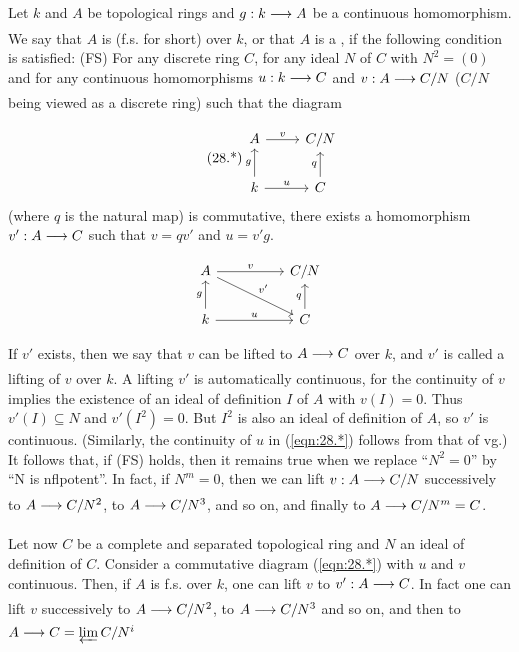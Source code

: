 \documentclass[../main]{subfiles}
\begin{document}
\begin{pardefinition}
Let $k$ and $A$ be topological rings and $g: k \varrightarrow{} A$ be a continuous homomorphism. We say that $A$ is \label{def:28.formally smooth} (f.s. for short) over $k$, or that $A$ is a , if the following condition is satisfied: (FS) For any discrete ring $C$, for any ideal $N$ of $C$ with $N^2=(0)$ and for any continuous homomorphisms $u: k \varrightarrow{} C$ and $v: A \varrightarrow{} C / N$ ($C / N$ being viewed as a discrete ring) such that the diagram

\[\tag{28.*}\label{eqn:28.*} \begin{tikzcd} A \arrow[r,"v"] & C/N\\ k \arrow[u,"g"] \arrow[r,"u"] &C \arrow[u,"q"]\end{tikzcd}\] (where $q$ is the natural map) is commutative, there exists a homomorphism \newline $v': A \varrightarrow{} C$ such that $v=q v'$ and $u=v'g$. \[\begin{tikzcd} A\arrow[rr,"v"] \arrow[rrd,"v'"] && C/N \\ k\arrow[u,"g"] \arrow[rr,"u"] &&C\arrow[u,"q"]\end{tikzcd}\]
\end{pardefinition}

\begin{remark}
If $v'$ exists, then we say that $v$ can be lifted to $A \varrightarrow{} C$ over $k$, and $v'$ is called a lifting of $v$ over $k$. A lifting $v'$ is automatically continuous, for the continuity of $v$ implies the existence of an ideal of definition $I$ of $A$ with $v(I)=0$. Thus $v'(I) \subseteq N$ and $v'(I^2)=0$. But $I^2$ is also an ideal of definition of $A$, so $v'$ is continuous. (Similarly, the continuity of $u$ in (\ref{eqn:28.*}) follows from that of vg.) It follows that, if (FS) holds, then it remains true when we replace ``$N^2=0$'' by ``N is nflpotent''. In fact, if $N^m=0$, then we can lift $v: A\varrightarrow{}C / N$ successively to $A \varrightarrow{} C / N^2$, to $A \varrightarrow{} C / N^3$, and so on, and finally to $A \varrightarrow{} C / N^m=C$.

Let now $C$ be a complete and separated topological ring and $N$ an ideal of definition of $C$. Consider a commutative diagram (\ref{eqn:28.*}) with $u$ and $v$ continuous. Then, if $A$ is f.s. over $k$, one can lift $v$ to $v': A \varrightarrow{} C$. In fact one can lift $v$ successively to $A \varrightarrow{} C / N^2$, to $A \varrightarrow{} C / N^3$ and so on, and then to $A \varrightarrow{} C=\varprojlim C / N^i$
\end{remark}
\end{document}
